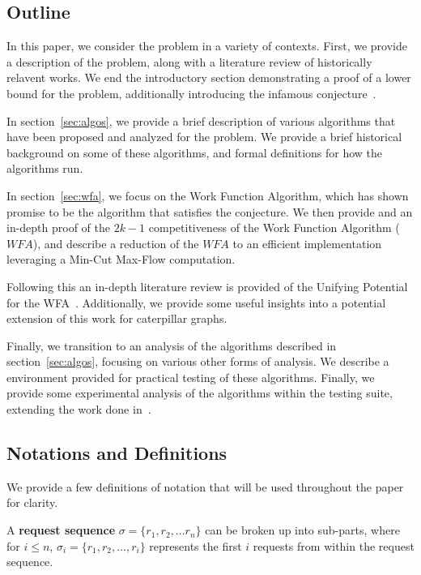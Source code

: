 \subsection{Outline}
\label{sec:out}
In this paper, we consider the \KS problem in a variety of contexts. First, we provide a description of the \KS problem, along with a literature review of historically relavent works. We end the introductory section demonstrating a proof of a lower bound for the problem, additionally introducing the infamous \KS conjecture~\cite{KS1988}. 

In section~\ref{sec:algos}, we provide a brief description of various algorithms that have been proposed and analyzed for the \KS problem. We provide a brief historical background on some of these algorithms, and formal definitions for how the algorithms run.

In section~\ref{sec:wfa}, we focus on the Work Function Algorithm, which has shown promise to be the algorithm that satisfies the \KS conjecture. We then provide and an in-depth proof of the $2k-1$ competitiveness of the Work Function Algorithm ($WFA$), and describe a reduction of the $WFA$ to an efficient implementation leveraging a Min-Cut Max-Flow computation.

Following this an in-depth literature review is provided of the Unifying Potential for the WFA~\cite{unifyingPotential2021}. Additionally, we provide some useful insights into a potential extension of this work for caterpillar graphs. 

Finally, we transition to an analysis of the algorithms described in section~\ref{sec:algos}, focusing on various other forms of analysis. We describe a \CC environment provided for practical testing of these algorithms. Finally, we provide some experimental analysis of the algorithms within the testing suite, extending the work done in~\cite{independantStudy2023}.

\subsection{Notations and Definitions}

We provide a few definitions of notation that will be used throughout the paper for clarity.

\begin{definition}
    A \textbf{request sequence} $\sigma = \{ r_1, r_2, ... r_n\}$ can be broken up into sub-parts, where for $i \leq n$, $\sigma_i = \{ r_1, r_2, ..., r_i\}$ represents the first $i$ requests from within the request sequence.
\end{definition}

